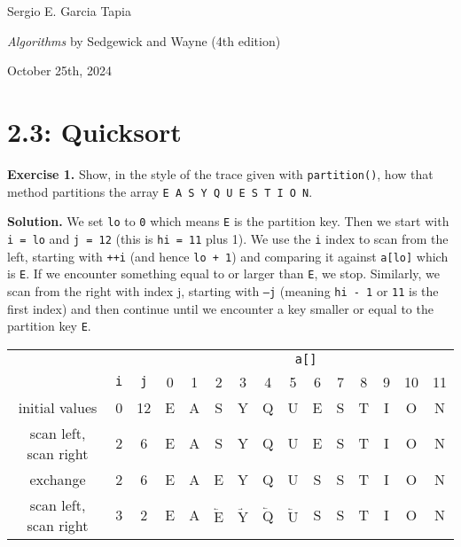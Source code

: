 \documentclass[12pt, a4paper]{article}
\newenvironment{ex}[2][Exercise]
{\par\medskip\noindent \textbf{#1 #2.}}
{\medskip}
\newenvironment{sol}[1][Solution]
{\par\medskip\noindent \textbf{#1.} }
{\medskip}
\begin{document}
	\noindent Sergio E. Garcia Tapia \hfill
	
	\noindent \emph{Algorithms} by Sedgewick and Wayne (4th edition) \cite{sedgewick_wayne}\hfill
	
	\noindent October 25th, 2024\hfill 
	\section*{2.3: Quicksort}
	\begin{ex}{1}
		Show, in the style of the trace given with \texttt{partition()}, how that method
		partitions the array \texttt{E A S Y Q U E S T I O N}.
	\end{ex}
	\begin{sol}
		We set \texttt{lo} to \texttt{0} which means \texttt{E} is the partition key.
		Then we start with \texttt{i = lo} and \texttt{j = 12} (this is \texttt{hi = 11}
		plus 1). We use the \texttt{i} index to scan from the left, starting with
		\texttt{++i} (and hence \texttt{lo + 1}) and comparing it against \texttt{a[lo]}
		which is \texttt{E}. If we encounter something equal to or larger than \texttt{E},
		we stop. Similarly, we scan from the right with index j, starting with \texttt{--j}
		(meaning \texttt{hi - 1} or \texttt{11} is the first index) and then continue
		until we encounter a key smaller or equal to the partition key \texttt{E}.
		\begin{center}
			\begin{tabular}{c|cc|cccccccccccc}
				{} & {} & {} & \multicolumn{12}{c}{\texttt{a[]}}\\
				{} & \texttt{i} & \texttt{j} & 0 & 1 & 2 & 3 & 4 & 5 & 6 & 7 & 8 & 9 & 10 & 11\\
				\hline
				{\color{red} initial values}
				& 0 & 12
				& {\color{red}E} & A & S & Y & Q & U & E & S & T & I & O & N\\
				
				{\color{red} scan left, scan right}
				& 2 & 6 
				& {\color{gray}E} & A & S & {\color{gray} Y} & {\color{gray} Q} & {\color{gray} U}
				& E & S & T & I & O & N\\
				
				{\color{red} exchange}
				& {\color{red} 2} & {\color{red} 6 }
				& {\color{gray}E} & {\color{gray}A} & {\color{red}E} & {\color{gray} Y} & {\color{gray} Q} & {\color{gray} U} & {\color{red}S} & {\color{gray}S}
				& {\color{gray}T} &{\color{gray}I} & {\color{gray}O} & {\color{gray}N}\\
				
				{\color{red} scan left, scan right}
				& {\color{red} 3} & {\color{red} 2 }
				& {\color{gray}E} & {\color{gray}A} & {\color{black}$\underleftarrow{\text{E}}$} & {\color{black} $\underrightarrow{\text{Y}}$} & {\color{black} $\underleftarrow{\text{Q}}$} & {\color{black} $\underleftarrow{\text{U}}$} & {\color{gray}S} & {\color{gray}S}
				& {\color{gray}T} &{\color{gray}I} & {\color{gray}O} & {\color{gray}N}\\
				

\end{tabular}
\end{center}
\end{sol}
\end{document}
